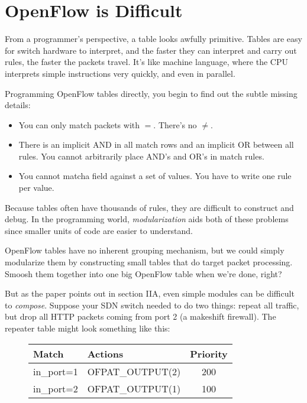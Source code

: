 \section{OpenFlow is Difficult}

From a programmer's perspective, a table looks awfully primitive.  
Tables are easy for switch hardware to interpret, and the faster they can interpret and carry 
out rules, the faster the packets travel.  
It's like machine language, where the CPU interprets simple instructions very quickly, and even in parallel.

Programming OpenFlow tables directly, you begin to find out the subtle missing details:

\begin{itemize}
\item You can only match packets with $=$.   There's no $\neq$.
\item There is an implicit AND in all match rows and an implicit OR between all rules.  You cannot 
arbitrarily place AND's and OR's in match rules.
\item You cannot matcha field against a set of values.  You have to write one rule per value.  
\end{itemize}

Because tables often have thousands of rules, they are difficult to construct and debug.  
In the programming world, \emph{modularization} aids both of these problems since smaller units of code
are easier to understand.  

OpenFlow tables have no inherent grouping mechanism, but we could simply modularize them by 
constructing small tables that do target packet processing.  Smoosh them together
into one big OpenFlow table when we're done, right?  

But as the paper \citet{frenetic} points out in section IIA, even simple modules can be difficult
to \emph{compose}.   Suppose your SDN switch needed to do two things: repeat all traffic, but drop all
HTTP packets coming from port 2 (a makeshift firewall).  The repeater table might look something like this:

\bigskip
\bigskip
\bigskip
\bigskip
\bigskip
\bigskip
\bigskip


\begin{figure}[h]
\centering
\begin{tabularx}{3.3in}{|l|l|c|}
\hline\hline
Match & Actions & Priority
\\ \hline
in\_port=1 & OFPAT\_OUTPUT(2) & 200
\\ \hline
in\_port=2 & OFPAT\_OUTPUT(1) & 100
\\ \hline\hline
\end{tabularx}
\end{figure}

